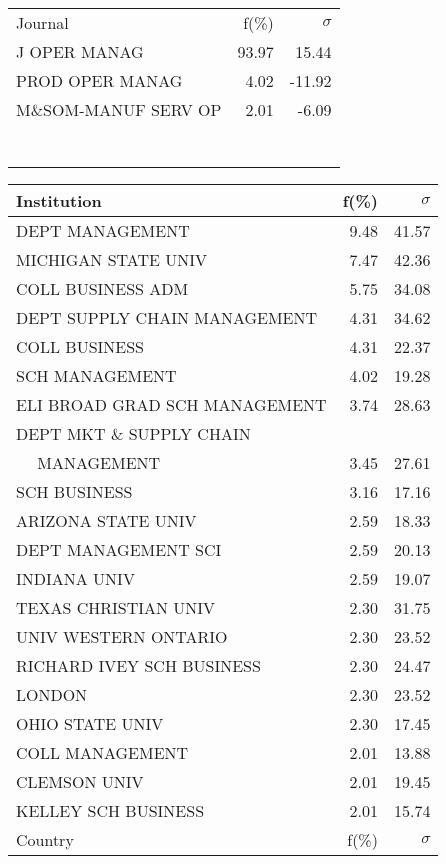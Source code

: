 \documentclass[a4paper,11pt]{report}
\begin{document}
\begin{landscape}
\begin{table}[!ht]
{\begin{tabular}{|l r r|}
 &  & \\
\hline
\hline
Journal & f(\%) & $\sigma$\\
\hline
J OPER MANAG & 93.97 & 15.44\\
PROD OPER MANAG & 4.02 & -11.92\\
M\&SOM-MANUF SERV OP & 2.01 & -6.09\\
 &  & \\
 &  & \\
 &  & \\
 &  & \\
 &  & \\
 &  & \\
 &  & \\
\hline
\end{tabular}
}
{\scriptsize\begin{tabular}{|l r r|}
\hline
Institution & f(\%) & $\sigma$\\
\hline
DEPT MANAGEMENT & 9.48 & 41.57\\
MICHIGAN STATE UNIV & 7.47 & 42.36\\
COLL BUSINESS ADM & 5.75 & 34.08\\
DEPT SUPPLY CHAIN MANAGEMENT & 4.31 & 34.62\\
COLL BUSINESS & 4.31 & 22.37\\
SCH MANAGEMENT & 4.02 & 19.28\\
ELI BROAD GRAD SCH MANAGEMENT & 3.74 & 28.63\\
DEPT MKT \& SUPPLY CHAIN &  & \\
$\quad$ MANAGEMENT & 3.45 & 27.61\\
SCH BUSINESS & 3.16 & 17.16\\
ARIZONA STATE UNIV & 2.59 & 18.33\\
DEPT MANAGEMENT SCI & 2.59 & 20.13\\
INDIANA UNIV & 2.59 & 19.07\\
TEXAS CHRISTIAN UNIV & 2.30 & 31.75\\
UNIV WESTERN ONTARIO & 2.30 & 23.52\\
RICHARD IVEY SCH BUSINESS & 2.30 & 24.47\\
LONDON & 2.30 & 23.52\\
OHIO STATE UNIV & 2.30 & 17.45\\
COLL MANAGEMENT & 2.01 & 13.88\\
CLEMSON UNIV & 2.01 & 19.45\\
KELLEY SCH BUSINESS & 2.01 & 15.74\\
\hline
\hline
Country & f(\%) & $\sigma$\\
\hline

\end{tabular}}
\end{table}
\end{landscape}
\end{document}
